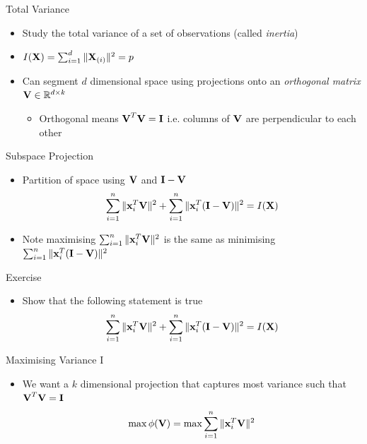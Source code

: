 \documentclass{beamer}
\begin{document}
\begin{frame}{Total Variance} 
\begin{itemize} 
 \item Study the total variance of a set of observations (called \emph{inertia})
 \item $I(\textbf{X}) = \sum_{i=1}^d \|\textbf{X}_{(i)}\|^2 = p$
 \item Can segment $d$ dimensional space using projections onto an \emph{orthogonal matrix} $\textbf{V} \in \mathbb{R}^{d \times k}$ 
 \begin{itemize}
  \item Orthogonal means $\textbf{V}^T\textbf{V} = \textbf{I}$ i.e. columns of $\textbf{V}$ are perpendicular to each other
 \end{itemize}
\end{itemize}
\end{frame}

\begin{frame}{Subspace Projection}
\begin{itemize} 
 \item Partition of space using $\textbf{V}$ and $\textbf{I} - \textbf{V}$
 \begin{displaymath}
  \sum_{i=1}^n \|\textbf{x}_{i}^T\textbf{V} \|^2 + \sum_{i=1}^n \|\textbf{x}_{i}^T(\textbf{I} - \textbf{V})\|^2 = I(\textbf{X})
 \end{displaymath}
\item Note maximising $\sum_{i=1}^n \|\textbf{x}_{i}^T\textbf{V} \|^2 $ is the same as minimising $\sum_{i=1}^n \|\textbf{x}_{i}^T(\textbf{I} - \textbf{V})\|^2$ 
\end{itemize}
\end{frame}

\begin{frame}{Exercise} 
\begin{itemize} 
 \item Show that the following statement is true
  \begin{displaymath}
  \sum_{i=1}^n \|\textbf{x}_{i}^T\textbf{V} \|^2 + \sum_{i=1}^n \|\textbf{x}_{i}^T(\textbf{I} - \textbf{V})\|^2 = I(\textbf{X})
 \end{displaymath}
\end{itemize}
\end{frame}


\begin{frame}{Maximising Variance I}
\begin{itemize}
 \item We want a $k$ dimensional projection that captures most variance such that $\textbf{V}^T\textbf{V} = \textbf{I}$
 \begin{displaymath}
  \max \phi(\textbf{V}) = \max \sum_{i=1}^n \|\textbf{x}_{i}^T\textbf{V} \|^2
 \end{displaymath}

\end{itemize}
\end{frame}
\end{document}
